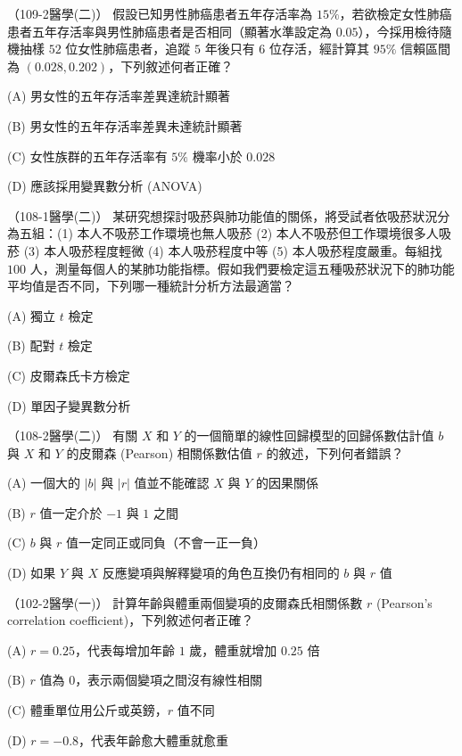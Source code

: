     \begin{docexam}{（109-2醫學(二)）}
        假設已知男性肺癌患者五年存活率為 $15\%$，若欲檢定女性肺癌患者五年存活率與男性肺癌患者是否相同（顯著水準設定為 $0.05$），今採用檢待隨機抽樣 $52$ 位女性肺癌患者，追蹤 $5$ 年後只有 $6$ 位存活，經計算其 $95\%$ 信賴區間為 $(0.028, 0.202)$，下列敘述何者正確？

        (A) 男女性的五年存活率差異達統計顯著
        
        (B) 男女性的五年存活率差異未達統計顯著

        (C) 女性族群的五年存活率有 $5\%$ 機率小於 $0.028$
 
        (D) 應該採用變異數分析 (ANOVA)
    \end{docexam}
    
    \begin{docexam}{（108-1醫學(二)）}
        某研究想探討吸菸與肺功能值的關係，將受試者依吸菸狀況分為五組：(1) 本人不吸菸工作環境也無人吸菸 (2) 本人不吸菸但工作環境很多人吸菸 (3) 本人吸菸程度輕微 (4) 本人吸菸程度中等 (5) 本人吸菸程度嚴重。每組找 $100$ 人，測量每個人的某肺功能指標。假如我們要檢定這五種吸菸狀況下的肺功能平均值是否不同，下列哪一種統計分析方法最適當？

        (A) 獨立 $t$ 檢定
        
        (B) 配對 $t$ 檢定

        (C) 皮爾森氏卡方檢定
 
        (D) 單因子變異數分析
    \end{docexam}
    
    \begin{docexam}{（108-2醫學(二)）}
        有關 $X$ 和 $Y$ 的一個簡單的線性回歸模型的回歸係數估計值 $b$ 與 $X$ 和 $Y$ 的皮爾森 (Pearson) 相關係數估值 $r$ 的敘述，下列何者錯誤？

        (A) 一個大的 $|b|$ 與 $|r|$ 值並不能確認 $X$ 與 $Y$ 的因果關係
        
        (B) $r$ 值一定介於 $-1$ 與 $1$ 之間

        (C) $b$ 與 $r$ 值一定同正或同負（不會一正一負）
 
        (D) 如果 $Y$ 與 $X$ 反應變項與解釋變項的角色互換仍有相同的 $b$ 與 $r$ 值
    \end{docexam}
    
    \begin{docexam}{（102-2醫學(一)）}
        計算年齡與體重兩個變項的皮爾森氏相關係數 $r$ (Pearson's correlation coefficient)，下列敘述何者正確？

        (A) $r = 0.25$，代表每增加年齡 $1$ 歲，體重就增加 $0.25$ 倍
        
        (B) $r$ 值為 $0$，表示兩個變項之間沒有線性相關

        (C) 體重單位用公斤或英鎊，$r$ 值不同
 
        (D) $r = -0.8$，代表年齡愈大體重就愈重
    \end{docexam}
    
